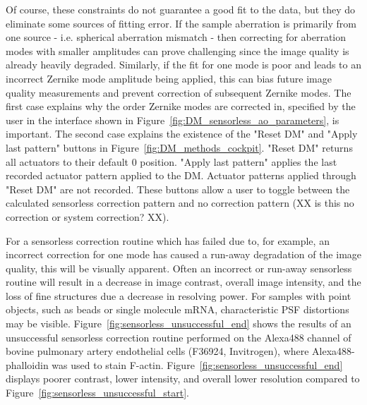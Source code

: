 Of course, these constraints do not guarantee a good fit to the data, but 
they do eliminate some sources of fitting error. If the sample aberration is 
primarily from one source - i.e. spherical aberration mismatch - then 
correcting for aberration modes with smaller amplitudes can prove challenging 
since the image quality is already heavily degraded. Similarly, if the fit 
for one mode is poor and leads to an incorrect Zernike mode amplitude being 
applied, this can bias future image quality measurements and prevent 
correction of subsequent Zernike modes. The first case explains why the order 
Zernike modes are corrected in, specified by the user in the interface shown 
in Figure~\ref{fig:DM_sensorless_ao_parameters}, is important. The second 
case explains the existence of the "Reset DM" and "Apply last pattern" 
buttons in Figure~\ref{fig:DM_methods_cockpit}. "Reset DM" returns all 
actuators to their default 0 position. "Apply last pattern" applies the last 
recorded actuator pattern applied to the DM. Actuator patterns applied 
through "Reset DM" are not recorded. These buttons allow a user to toggle 
between the calculated sensorless correction pattern and no correction 
pattern (XX is this no correction or system correction? XX). 

For a sensorless correction routine which has failed due to, for example, an 
incorrect correction for one mode has caused a run-away degradation of the 
image quality, this will be visually apparent. Often an incorrect or run-away 
sensorless routine will result in a decrease in image contrast, overall image 
intensity, and the loss of fine structures due a decrease in resolving power. 
For samples with point objects, such as beads or single molecule mRNA, 
characteristic PSF distortions may be visible. 
Figure~\ref{fig:sensorless_unsuccessful_end} shows the results of an 
unsuccessful sensorless correction routine performed on the Alexa488 channel 
of bovine pulmonary artery endothelial cells (F36924, Invitrogen), where 
Alexa488-phalloidin was used to stain F-actin. 
Figure~\ref{fig:sensorless_unsuccessful_end} displays poorer contrast, lower 
intensity, and overall lower resolution compared to 
Figure~\ref{fig:sensorless_unsuccessful_start}.

